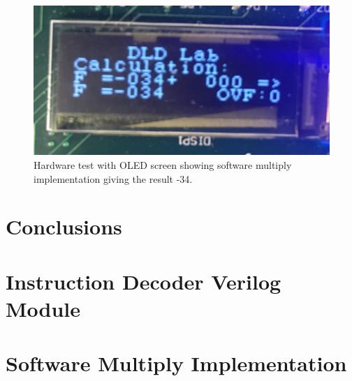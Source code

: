\documentclass[12pt, letterpaper]{article}
\begin{document}
\begin{figure}[h]
\centering
\includegraphics[width=0.8\linewidth]{images/lab8-hardware-test-2.png}
\caption{Hardware test with OLED screen showing software multiply implementation giving the result -34.}
\end{figure}


\FloatBarrier\newpage
\section{Conclusions}


\newpage
\appendix
\appendixpage
\addappheadtotoc 

\section{Instruction Decoder Verilog Module}


\section{Software Multiply Implementation}

\end{document}
